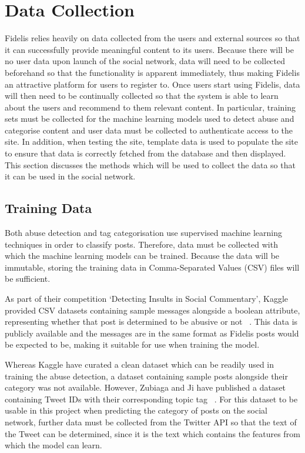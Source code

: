 \section{Data Collection}
Fidelis relies heavily on data collected from the users and external sources so that it can successfully provide meaningful content to its users. Because there will be no user data upon launch of the social network, data will need to be collected beforehand so that the functionality is apparent immediately, thus making Fidelis an attractive platform for users to register to. Once users start using Fidelis, data will then need to be continually collected so that the system is able to learn about the users and recommend to them relevant content. In particular, training sets must be collected for the machine learning models used to detect abuse and categorise content and user data must be collected to authenticate access to the site. In addition, when testing the site, template data is used to populate the site to ensure that data is correctly fetched from the database and then displayed. This section discusses the methods which will be used to collect the data so that it can be used in the social network.

\subsection{Training Data}
Both abuse detection and tag categorisation use supervised machine learning techniques in order to classify posts.  Therefore, data must be collected with which the machine learning models can be trained. Because the data will be immutable, storing the training data in Comma-Separated Values (CSV) files will be sufficient.

As part of their competition `Detecting Insults in Social Commentary', Kaggle provided CSV datasets containing sample messages alongside a boolean attribute, representing whether that post is determined to be abusive or not ~\cite{Kaggle:Dataset}. This data is publicly available and the messages are in the same format as Fidelis posts would be expected to be, making it suitable for use when training the model.

Whereas Kaggle have curated a clean dataset which can be readily used in training the abuse detection, a dataset containing sample posts alongside their category was not available. However, Zubiaga and Ji have published a dataset containing Tweet IDs with their corresponding topic tag ~\cite{Zubiaga:Tweets}. For this dataset to be usable in this project when predicting the category of posts on the social network, further data must be collected from the Twitter API so that the text of the Tweet can be determined, since it is the text which contains the features from which the model can learn.


